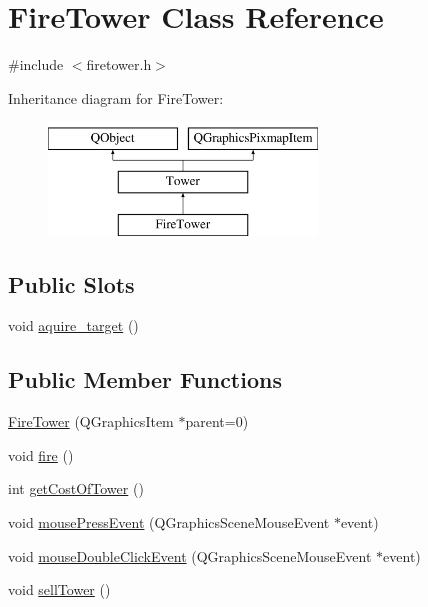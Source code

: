 \hypertarget{class_fire_tower}{}\section{Fire\+Tower Class Reference}
\label{class_fire_tower}


{\ttfamily \#include $<$firetower.\+h$>$}

Inheritance diagram for Fire\+Tower\+:\begin{figure}[H]
\begin{center}
\leavevmode
\includegraphics[height=3.000000cm]{class_fire_tower}
\end{center}
\end{figure}
\subsection*{Public Slots}
\begin{DoxyCompactItemize}
\item 
void \hyperlink{class_fire_tower_a4a3c1e246ed66479aabff4ab5d187636}{aquire\+\_\+target} ()
\end{DoxyCompactItemize}
\subsection*{Public Member Functions}
\begin{DoxyCompactItemize}
\item 
\hyperlink{class_fire_tower_ad375e5ef0c469832741f6a541f3caae1}{Fire\+Tower} (Q\+Graphics\+Item $\ast$parent=0)
\item 
void \hyperlink{class_fire_tower_a9a0b13fcb0bc204194d953c5494afbe3}{fire} ()
\item 
int \hyperlink{class_fire_tower_a74be102e9bb0871f19fb55b434e2b6d7}{get\+Cost\+Of\+Tower} ()
\item 
void \hyperlink{class_fire_tower_a1768ca309eccef5f7f093f37741ba572}{mouse\+Press\+Event} (Q\+Graphics\+Scene\+Mouse\+Event $\ast$event)
\item 
void \hyperlink{class_fire_tower_a4deed164ccfbabcd7fc67e3973015f9f}{mouse\+Double\+Click\+Event} (Q\+Graphics\+Scene\+Mouse\+Event $\ast$event)
\item 
void \hyperlink{class_fire_tower_adc1bcb15312eac1dd9788be48e55baad}{sell\+Tower} ()
\end{DoxyCompactItemize}
